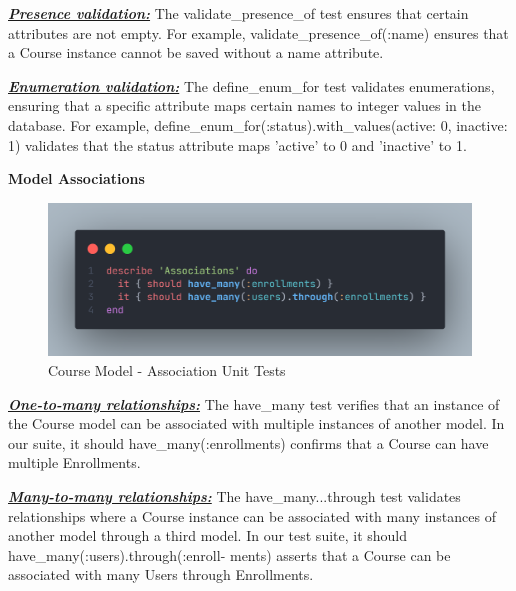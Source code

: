 \begin{justify}
\vspace{-0.25cm}
\noindent\textbf{\textit{\underline{Presence validation:}}} The validate\_presence\_of test ensures that certain attributes are not empty. For example, validate\_presence\_of(:name) ensures that a Course instance cannot be saved without a name attribute.

\vspace{0.25cm}
\noindent\textbf{\textit{\underline{Enumeration validation:}}} The define\_enum\_for test validates enumerations, ensuring that a specific attribute maps certain names to integer values in the database. For example, define\_enum\_for(:status).with\_values(active: 0, inactive: 1) validates that the status attribute maps 'active' to 0 and 'inactive' to 1.

\vspace{0.25cm}
\newendline
\textbf{Model Associations}

    \begin{figure}[H]
        \centerline{\includegraphics[width=140mm,scale=1]{figures/implementation_and_testing/testing/AUT/course/associations.png}}
        \caption{Course Model - Association Unit Tests}
        \label{Course Model - Association Unit Tests}
    \end{figure}

\vspace{0.25cm}
\noindent\textbf{\textit{\underline{One-to-many relationships:}}} The have\_many test verifies that an instance of the Course model can be associated with multiple instances of another model. In our suite, it { should have\_many(:enrollments) } confirms that a Course can have multiple Enrollments.

\vspace{0.25cm}
\noindent\textbf{\textit{\underline{Many-to-many relationships:}}} The have\_many...through test validates relationships where a Course instance can be associated with many instances of another model through a third model. In our test suite, it { should have\_many(:users).through(:enroll- ments) } asserts that a Course can be associated with many Users through Enrollments.



\end{justify}

